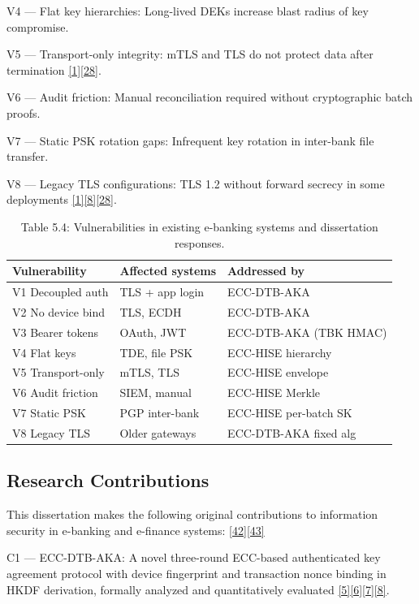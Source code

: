 \indent V4 --- Flat key hierarchies: Long-lived DEKs increase blast radius of key compromise.

\indent V5 --- Transport-only integrity: mTLS and TLS do not protect data after termination \hyperref[ref:1]{[1]}\hyperref[ref:28]{[28]}.

\indent V6 --- Audit friction: Manual reconciliation required without cryptographic batch proofs.

\indent V7 --- Static PSK rotation gaps: Infrequent key rotation in inter-bank file transfer.

\indent V8 --- Legacy TLS configurations: TLS 1.2 without forward secrecy in some deployments \hyperref[ref:1]{[1]}\hyperref[ref:8]{[8]}\hyperref[ref:28]{[28]}.

\begin{table}[htbp]
\centering
\begin{tabular}{lll}
\toprule
Vulnerability & Affected systems & Addressed by \\
\midrule
V1 Decoupled auth & TLS + app login & ECC-DTB-AKA \\
V2 No device bind & TLS, ECDH & ECC-DTB-AKA \\
V3 Bearer tokens & OAuth, JWT & ECC-DTB-AKA (TBK HMAC) \\
V4 Flat keys & TDE, file PSK & ECC-HISE hierarchy \\
V5 Transport-only & mTLS, TLS & ECC-HISE envelope \\
V6 Audit friction & SIEM, manual & ECC-HISE Merkle \\
V7 Static PSK & PGP inter-bank & ECC-HISE per-batch SK \\
V8 Legacy TLS & Older gateways & ECC-DTB-AKA fixed alg \\
\bottomrule
\end{tabular}
\caption{Table 5.4: Vulnerabilities in existing e-banking systems and dissertation responses.}\label{tbl:5.4}
\end{table}
\subsection{Research Contributions}

\indent This dissertation makes the following original contributions to information security in e-banking and e-finance systems: \hyperref[ref:42]{[42]}\hyperref[ref:43]{[43]}

\indent C1 --- ECC-DTB-AKA: A novel three-round ECC-based authenticated key agreement protocol with device fingerprint and transaction nonce binding in HKDF derivation, formally analyzed and quantitatively evaluated \hyperref[ref:5]{[5]}\hyperref[ref:6]{[6]}\hyperref[ref:7]{[7]}\hyperref[ref:8]{[8]}.

